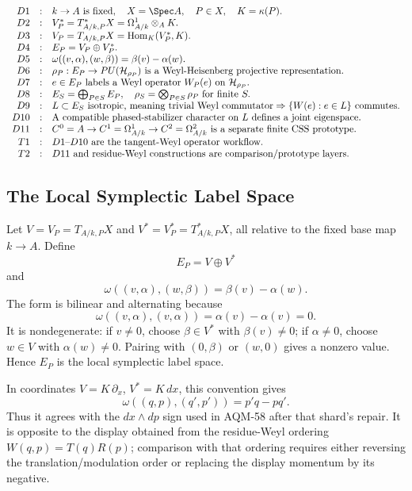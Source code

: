 \[
\begin{array}{rcl}
D1&:&k\to A\text{ is fixed},\quad X=\Spec A,\quad P\in X,\quad K=\kappa(P).\\
D2&:&V_P^*=T_{A/k,P}^*X=\Omega^1_{A/k}\otimes_AK.\\
D3&:&V_P=T_{A/k,P}X=\operatorname{Hom}_K(V_P^*,K).\\
D4&:&E_P=V_P\oplus V_P^*.\\
D5&:&\omega((v,\alpha),(w,\beta))=\beta(v)-\alpha(w).\\
D6&:&\rho_P:E_P\to PU(\mathcal H_{\rho_P})
      \text{ is a Weyl-Heisenberg projective representation}.\\
D7&:&e\in E_P\text{ labels a Weyl operator }W_P(e)\text{ on }
      \mathcal H_{\rho_P}.\\
D8&:&E_S=\bigoplus_{P\in S}E_P,\quad
      \rho_S=\bigotimes_{P\in S}\rho_P
      \text{ for finite }S.\\
D9&:&L\subset E_S\text{ isotropic, meaning trivial Weyl commutator}
      \Rightarrow \{W(e):e\in L\}\text{ commutes}.\\
D10&:&\text{A compatible phased-stabilizer character on }L
       \text{ defines a joint eigenspace}.\\
D11&:&C^0=A\to C^1=\Omega^1_{A/k}\to C^2=\Omega^2_{A/k}
      \text{ is a separate finite CSS prototype}.\\
T1&:&D1\text{--}D10\text{ are the tangent-Weyl operator workflow}.\\
T2&:&D11\text{ and residue-Weyl constructions are comparison/prototype layers}.
\end{array}
\]

\subsection{The Local Symplectic Label Space}

Let \(V=V_P=T_{A/k,P}X\) and \(V^*=V_P^*=T^*_{A/k,P}X\), all relative to the
fixed base map \(k\to A\).  Define
\[
  E_P=V\oplus V^*
\]
and
\[
  \omega((v,\alpha),(w,\beta))=\beta(v)-\alpha(w).
\]
The form is bilinear and alternating because
\[
  \omega((v,\alpha),(v,\alpha))=\alpha(v)-\alpha(v)=0.
\]
It is nondegenerate: if \(v\ne0\), choose \(\beta\in V^*\) with
\(\beta(v)\ne0\); if \(\alpha\ne0\), choose \(w\in V\) with
\(\alpha(w)\ne0\).  Pairing with \((0,\beta)\) or \((w,0)\) gives a nonzero
value.  Hence \(E_P\) is the local symplectic label space.

In coordinates \(V=K\,\partial_x\), \(V^*=K\,dx\), this convention gives
\[
  \omega((q,p),(q',p'))=p' q-p q'.
\]
Thus it agrees with the \(dx\wedge dp\) sign used in AQM-58 after that shard's
repair.  It is opposite to the display obtained from the residue-Weyl ordering
\(W(q,p)=T(q)R(p)\); comparison with that ordering requires either reversing
the translation/modulation order or replacing the display momentum by its
negative.

